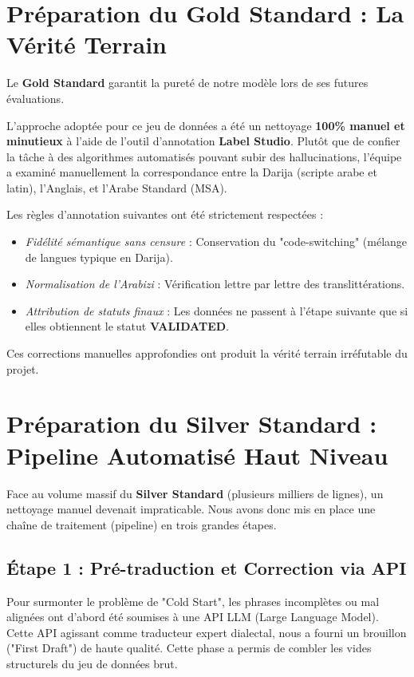 \documentclass[12pt,a4paper]{article}
\begin{document}
\section{Préparation du Gold Standard : La Vérité Terrain}
Le \textbf{Gold Standard} garantit la pureté de notre modèle lors de ses futures évaluations. 

L'approche adoptée pour ce jeu de données a été un nettoyage \textbf{100\% manuel et minutieux} à l'aide de l'outil d'annotation \textbf{Label Studio}.
Plutôt que de confier la tâche à des algorithmes automatisés pouvant subir des hallucinations, l'équipe a examiné manuellement la correspondance entre la Darija (scripte arabe et latin), l'Anglais, et l'Arabe Standard (MSA). 

Les règles d'annotation suivantes ont été strictement respectées :
\begin{itemize}
    \item \textit{Fidélité sémantique sans censure} : Conservation du "code-switching" (mélange de langues typique en Darija).
    \item \textit{Normalisation de l'Arabizi} : Vérification lettre par lettre des translittérations.
    \item \textit{Attribution de statuts finaux} : Les données ne passent à l'étape suivante que si elles obtiennent le statut \textbf{VALIDATED}.
\end{itemize}
Ces corrections manuelles approfondies ont produit la vérité terrain irréfutable du projet.

\section{Préparation du Silver Standard : Pipeline Automatisé Haut Niveau}
Face au volume massif du \textbf{Silver Standard} (plusieurs milliers de lignes), un nettoyage manuel devenait impraticable. Nous avons donc mis en place une chaîne de traitement (pipeline) en trois grandes étapes.

\subsection{Étape 1 : Pré-traduction et Correction via API}
Pour surmonter le problème de "Cold Start", les phrases incomplètes ou mal alignées ont d'abord été soumises à une API LLM (Large Language Model). Cette API agissant comme traducteur expert dialectal, nous a fourni un brouillon ("First Draft") de haute qualité. Cette phase a permis de combler les vides structurels du jeu de données brut.
\end{document}
